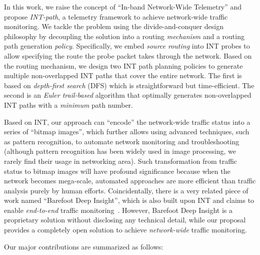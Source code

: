 In this work, we raise the concept of ``In-band Network-Wide Telemetry'' and propose \emph{INT-path}, a telemetry framework to achieve network-wide traffic monitoring. We tackle the problem using the divide-and-conquer design philosophy by decoupling the solution into a routing \emph{mechanism} and a routing path generation \emph{policy}. Specifically, we embed \emph{source routing} into INT probes to allow specifying the route the probe packet takes through the network. Based on the routing mechanism, we design two INT path planning policies to generate multiple non-overlapped INT paths that cover the entire network. The first is based on \emph{depth-first search} (DFS) which is straightforward but time-efficient. The second is an \emph{Euler trail-based} algorithm that optimally generates non-overlapped INT paths with a \emph{minimum} path number.
 
Based on INT, our approach can ``encode'' the network-wide traffic status into a series of ``bitmap images'', which further allows using advanced techniques, such as pattern recognition, to automate network monitoring and troubleshooting (although pattern recognition has been widely used in image processing, we rarely find their usage in networking area). Such transformation from traffic status to bitmap images will have profound significance because when the network becomes mega-scale, automated approaches are more efficient than traffic analysis purely by human efforts. Coincidentally, there is a very related piece of work named ``Barefoot Deep Insight'', which is also built upon INT and claims to enable \emph{end-to-end} traffic monitoring~\cite{deepinsight}. However, Barefoot Deep Insight is a proprietary solution without disclosing any technical detail, while our proposal provides a completely open solution to achieve \emph{network-wide} traffic monitoring.

Our major contributions are summarized as follows:

